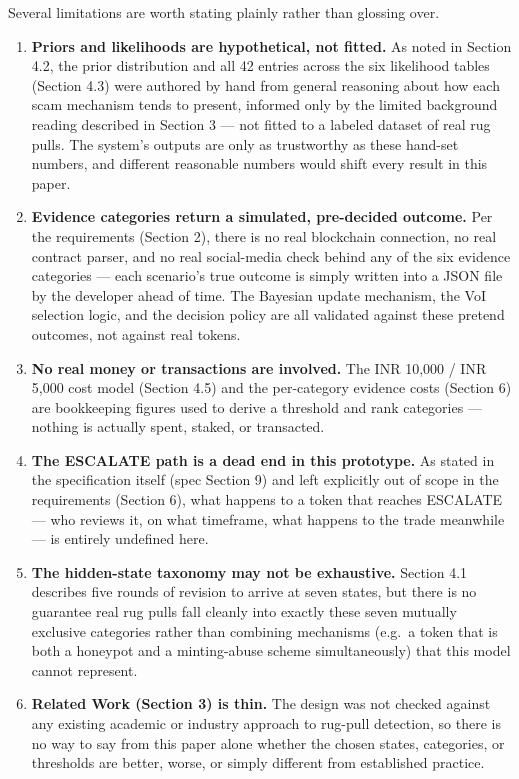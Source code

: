 \documentclass[11pt]{article}
\begin{document}
Several limitations are worth stating plainly rather than glossing over.

\begin{enumerate}
    \item \textbf{Priors and likelihoods are hypothetical, not fitted.} As noted in Section 4.2, the prior distribution and all 42 entries across the six likelihood tables (Section 4.3) were authored by hand from general reasoning about how each scam mechanism tends to present, informed only by the limited background reading described in Section 3 --- not fitted to a labeled dataset of real rug pulls. The system's outputs are only as trustworthy as these hand-set numbers, and different reasonable numbers would shift every result in this paper.

    \item \textbf{Evidence categories return a simulated, pre-decided outcome.} Per the requirements (Section 2), there is no real blockchain connection, no real contract parser, and no real social-media check behind any of the six evidence categories --- each scenario's true outcome is simply written into a JSON file by the developer ahead of time. The Bayesian update mechanism, the VoI selection logic, and the decision policy are all validated against these pretend outcomes, not against real tokens.

    \item \textbf{No real money or transactions are involved.} The INR 10,000 / INR 5,000 cost model (Section 4.5) and the per-category evidence costs (Section 6) are bookkeeping figures used to derive a threshold and rank categories --- nothing is actually spent, staked, or transacted.

    \item \textbf{The ESCALATE path is a dead end in this prototype.} As stated in the specification itself (spec Section 9) and left explicitly out of scope in the requirements (Section 6), what happens to a token that reaches ESCALATE --- who reviews it, on what timeframe, what happens to the trade meanwhile --- is entirely undefined here.

    \item \textbf{The hidden-state taxonomy may not be exhaustive.} Section 4.1 describes five rounds of revision to arrive at seven states, but there is no guarantee real rug pulls fall cleanly into exactly these seven mutually exclusive categories rather than combining mechanisms (e.g.\ a token that is both a honeypot and a minting-abuse scheme simultaneously) that this model cannot represent.

    \item \textbf{Related Work (Section 3) is thin.} The design was not checked against any existing academic or industry approach to rug-pull detection, so there is no way to say from this paper alone whether the chosen states, categories, or thresholds are better, worse, or simply different from established practice.
\end{enumerate}
\end{document}
